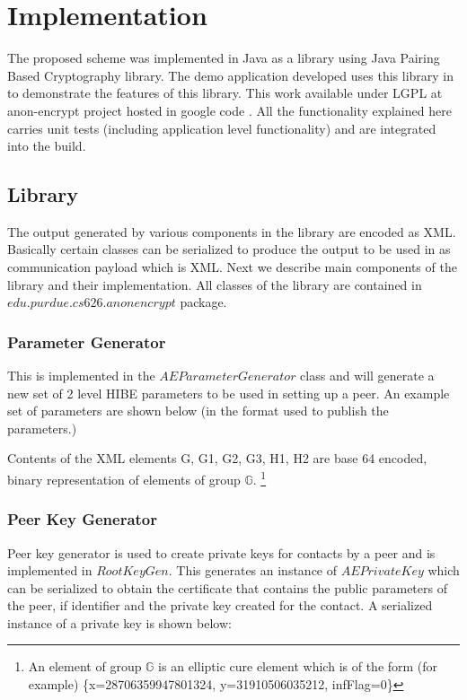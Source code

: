 \section{Implementation}
The proposed scheme was implemented in Java as a library using Java Pairing Based Cryptography \cite{jpbc} library. The demo application developed uses this library in to demonstrate the features of this library. This work available under LGPL at anon-encrypt project hosted in google code \cite{ae}. All the functionality explained here carries unit tests (including application level functionality) and are integrated into the build.

\subsection{Library}

The output generated by various components in the library are encoded as XML. Basically certain classes can be serialized to produce the output to be used in as communication payload which is XML. Next we describe main components of the library and their implementation. All classes of the library are contained in $edu.purdue.cs626.anonencrypt$ package.\\

\subsubsection{Parameter Generator}
This is implemented in the $AEParameterGenerator$ class and will generate a new set of 2 level HIBE parameters to be used in setting up a peer. An example set of parameters are shown below (in the format used to publish the parameters.)



Contents of the XML elements G, G1, G2, G3, H1, H2 are base 64 encoded, binary representation of elements of group $\mathbb{G}$. \footnote{An element of group $\mathbb{G}$ is an elliptic cure element which is of the form (for example) \{x=28706359947801324, y=31910506035212, infFlag=0\}}\\

\subsubsection{Peer Key Generator}
Peer key generator is used to create private keys for contacts by a peer and is implemented in $RootKeyGen$. This generates an instance of $AEPrivateKey$ which can be serialized to obtain the certificate that contains the public parameters of the peer, if identifier and the private key created for the contact. A serialized instance of a private key is shown below:

